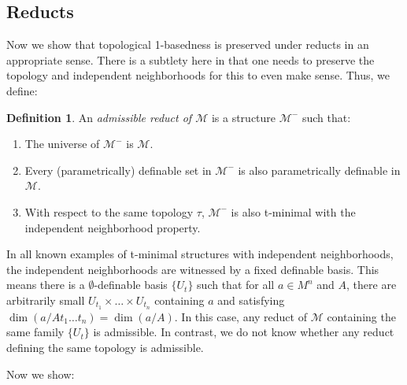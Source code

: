 \documentclass{amsart}
\theoremstyle{definition}
\newtheorem{definition}[theorem]{Definition}
\begin{document}
\subsection{Reducts}\label{ss: reducts} Now we show that topological 1-basedness is preserved under reducts in an appropriate sense. There is a subtlety here in that one needs to preserve the topology and independent neighborhoods for this to even make sense. Thus, we define:

\begin{definition}
    An \textit{admissible reduct of $\mathcal M$} is a structure $\mathcal M^-$ such that:
    \begin{enumerate}
        \item The universe of $\mathcal M^-$ is $\mathcal M$.
        \item Every (parametrically) definable set in $\mathcal M^-$ is also parametrically definable in $\mathcal M$.
        \item With respect to the same topology $\tau$, $\mathcal M^-$ is also t-minimal with the independent neighborhood property. 
    \end{enumerate}
\end{definition}

In all known examples of t-minimal structures with independent neighborhoods, the independent neighborhoods are witnessed by a fixed definable basis. This means there is a $\emptyset$-definable basis $\{U_t\}$ such that for all $a\in M^n$ and $A$, there are arbitrarily small $U_{t_1}\times\dots\times U_{t_n}$ containing $a$ and satisfying $\dim(a/At_1\dots t_n)=\dim(a/A)$. In this case, any reduct of $\mathcal M$ containing the same family $\{U_t\}$ is admissible. In contrast, we do not know whether any reduct defining the same topology is admissible.

Now we show:
\end{document}
